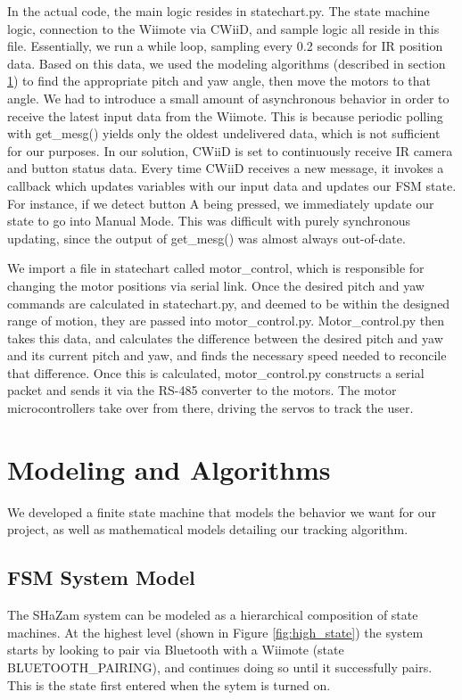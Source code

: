 \documentclass[conference, twocolumn]{IEEEtran}
\begin{document}
In the actual code, the main logic resides in statechart.py. The state machine logic, connection to the Wiimote via CWiiD, and sample logic all reside in this file. Essentially, we run a while loop, sampling every 0.2 seconds for IR position data. Based on this data, we used the modeling algorithms (described in section \ref{sec:algorithms}) to find the appropriate pitch and yaw angle, then move the motors to that angle. We had to introduce a small amount of asynchronous behavior in order to receive the latest input data from the Wiimote. This is because periodic polling with get\_mesg() yields only the oldest undelivered data, which is not sufficient for our purposes. In our solution, CWiiD is set to continuously receive IR camera and button status data. Every time CWiiD receives a new message, it invokes a callback which updates variables with our input data and updates our FSM state. For instance, if we detect button A being pressed, we immediately update our state to go into Manual Mode. This was difficult with purely synchronous updating, since the output of get\_mesg() was almost always out-of-date.

We import a file in statechart called motor\_control, which is responsible for changing the motor positions via serial link. Once the desired pitch and yaw commands are calculated in statechart.py, and deemed to be within the designed range of motion, they are passed into motor\_control.py. Motor\_control.py then takes this data, and calculates the difference between the desired pitch and yaw and its current pitch and yaw, and finds the necessary speed needed to reconcile that difference. Once this is calculated, motor\_control.py constructs a serial packet and sends it via the \mbox{RS-485} converter to the motors. The motor microcontrollers take over from there, driving the servos to track the user.

\section{Modeling and Algorithms}
\label{sec:algorithms}
We developed a finite state machine that models the behavior we want for our project, as well as mathematical models detailing our tracking algorithm.
 
 \subsection*{FSM System Model}
 The SHaZam system can be modeled as a hierarchical composition of state machines. At the highest level (shown in Figure \ref{fig:high_state}) the system starts by looking to pair via Bluetooth with a Wiimote (state BLUETOOTH\_PAIRING), and continues doing so until it successfully pairs. This is the state first entered when the sytem is turned on.
 
\end{document}
